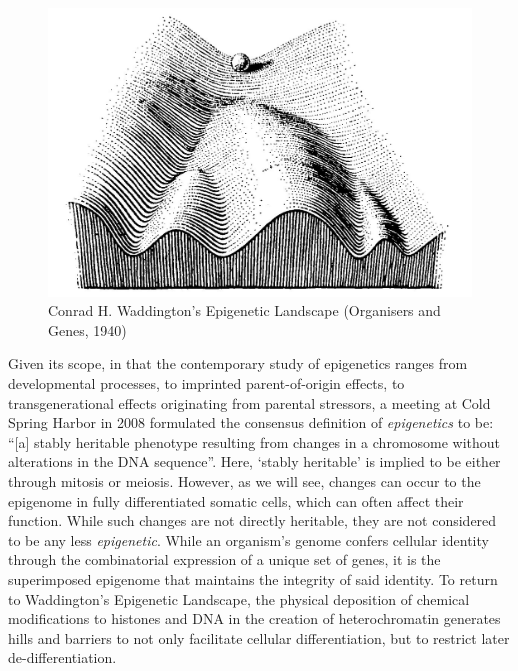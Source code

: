 \documentclass[onehalf,12pt]{beavtex}
\begin{document}
  \begin{figure}
  
  {\centering \includegraphics[width=1\linewidth, ]{./figure/introduction/image_epigenetic} 
  
  }
  
  \caption[Conrad H. Waddington's Epigenetic Landscape]{Conrad H. Waddington's Epigenetic Landscape (Organisers and Genes, 1940)}\label{fig:landscape}
  \end{figure}
  
  Given its scope, in that the contemporary study of epigenetics ranges
  from developmental processes, to imprinted parent-of-origin effects, to
  transgenerational effects originating from parental stressors, a meeting
  at Cold Spring Harbor in 2008 formulated the consensus definition of
  \emph{epigenetics} to be: ``{[}a{]} stably heritable phenotype resulting
  from changes in a chromosome without alterations in the DNA sequence''.
  Here, `stably heritable' is implied to be either through mitosis or
  meiosis. However, as we will see, changes can occur to the epigenome in
  fully differentiated somatic cells, which can often affect their
  function. While such changes are not directly heritable, they are not
  considered to be any less \emph{epigenetic}. While an organism's genome
  confers cellular identity through the combinatorial expression of a
  unique set of genes, it is the superimposed epigenome that maintains the
  integrity of said identity. To return to Waddington's Epigenetic
  Landscape, the physical deposition of chemical modifications to histones
  and DNA in the creation of heterochromatin generates hills and barriers
  to not only facilitate cellular differentiation, but to restrict later
  de-differentiation.
  
\end{document}
